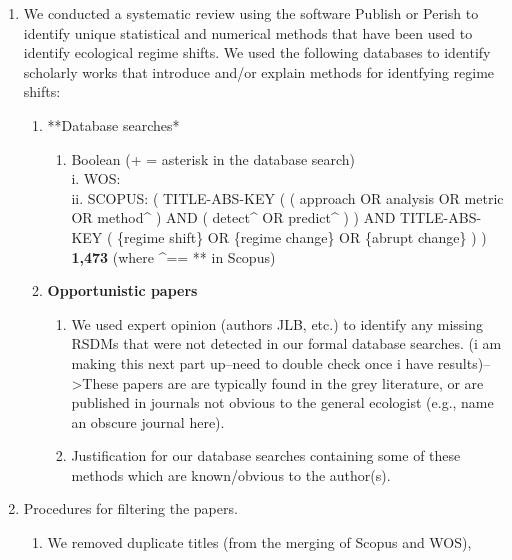 \documentclass[12pt,twoside]{reedthesis}
\providecommand{\tightlist}{%
  \setlength{\itemsep}{0pt}\setlength{\parskip}{0pt}}
\def\labelenumi{\arabic{enumi}.}
\def\labelenumi{\arabic{enumi}.}
\begin{document}
\begin{enumerate}
\def\labelenumi{\arabic{enumi}.}
\tightlist
\item
  We conducted a systematic review using the software Publish or Perish
  to identify unique statistical and numerical methods that have been
  used to identify ecological regime shifts. We used the following
  databases to identify scholarly works that introduce and/or explain
  methods for identfying regime shifts:
  \begin{enumerate}
  \def\labelenumii{\roman{enumii}.}
  \tightlist
  \item
    **Database searches*
    \begin{enumerate}
    \def\labelenumiii{\alph{enumiii}.}
    \tightlist
    \item
      Boolean (+ = asterisk in the database search)\\
      i. WOS:\\
      ii. SCOPUS: ( TITLE-ABS-KEY ( ( approach OR analysis OR metric OR
      method\^{} ) AND ( detect\^{} OR predict\^{} ) ) AND TITLE-ABS-KEY
      ( \{regime shift\} OR \{regime change\} OR \{abrupt change\} ) )
      \textbf{1,473} (where \^{}== ** in Scopus)
    \end{enumerate}
  \item
    \textbf{Opportunistic papers}
    \begin{enumerate}
    \def\labelenumiii{\alph{enumiii}.}
    \tightlist
    \item
      We used expert opinion (authors JLB, etc.) to identify any missing
      RSDMs that were not detected in our formal database searches. (i
      am making this next part up--need to double check once i have
      results)--\textgreater{}These papers are are typically found in
      the grey literature, or are published in journals not obvious to
      the general ecologist (e.g., name an obscure journal here).\\
    \item
      Justification for our database searches containing some of these
      methods which are known/obvious to the author(s).
    \end{enumerate}
  \end{enumerate}
\item
  Procedures for filtering the papers.
  \begin{enumerate}
  \def\labelenumii{\roman{enumii}.}
  \tightlist
  \item
    We removed duplicate titles (from the merging of Scopus and WOS),

\end{enumerate}
\end{enumerate}
\end{document}
